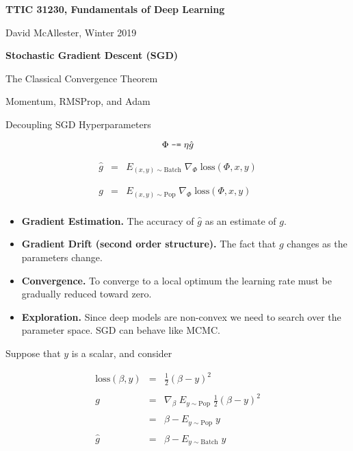 


\newcommand{\solution}[1]{\bigskip {\bf Solution}: #1}



{\Huge
  \centerline{\bf TTIC 31230, Fundamentals of Deep Learning}
  \bigskip
  \centerline{David McAllester, Winter 2019}
  \vfill
  \centerline{\bf Stochastic Gradient Descent (SGD)}
  \vfill
  \centerline{The Classical Convergence Theorem}
  \vfill
  \centerline{Momentum, RMSProp, and Adam}
  \vfill
  \centerline{Decoupling SGD Hyperparameters}


$$\Phi \;\mbox{\tt -=}\; \eta \hat{g}$$

\vfill
\begin{eqnarray*}
  \hat{g} & = & E_{(x,y) \sim \mathrm{Batch}}\;\nabla_\Phi\;\mathrm{loss}(\Phi,x,y) \\
  \\
  \\
  g & = & E_{(x,y) \sim \mathrm{Pop}}\;\nabla_\Phi\;\mathrm{loss}(\Phi,x,y) \\
\end{eqnarray*}


\vfill
\begin{itemize}
\item {\bf Gradient Estimation.} The accuracy of $\hat{g}$ as an estimate of $g$.

  \vfill
\item {\bf Gradient Drift (second order structure).} The fact that $g$ changes as the parameters change.

  \vfill
\item {\bf Convergence.} To converge to a local optimum the learning rate must be gradually reduced toward zero.

  \vfill
  \item {\bf Exploration.} Since deep models are non-convex we need to search over the parameter space.  SGD can behave like MCMC.
\end{itemize}


Suppose that $y$ is a scalar, and consider

\begin{eqnarray*}
 \mathrm{loss}(\beta,y) & = & \frac{1}{2}(\beta - y)^2 \\
 \\
  g & = &  \nabla_\beta\;E_{y \sim \mathrm{Pop}}\;\frac{1}{2}(\beta - y)^2 \\
  \\
  & = & \beta - E_{y \sim \mathrm{Pop}} \; y \\
  \\
  \hat{g} & = &\beta - E_{y \sim \mathrm{Batch}} \;y
\end{eqnarray*}

}
